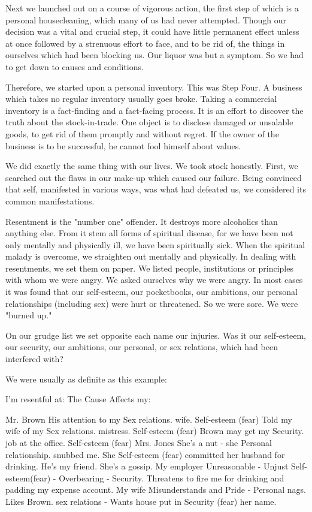 \begin{biblechapter}
Next we launched out on a course of vigorous action, the first step of which is a personal housecleaning, which many of us had never attempted.  Though our  decision was a vital and crucial step, it could have little permanent effect unless at once followed by a strenuous effort to face, and to be rid of, the things in ourselves which had been blocking us.  Our liquor was but a symptom.  So we had to get down to causes and conditions.

Therefore, we started upon a personal inventory.  This was Step Four.  A business which takes no regular inventory usually goes broke.  Taking a commercial  inventory is a fact-finding and a fact-facing process.  It is an effort to discover the truth about the stock-in-trade.  One object is to disclose damaged or unsalable goods, to get rid of them promptly and without regret.  If the owner of the business is to be successful, he cannot fool himself about values.

We did exactly the same thing with our lives.  We took stock honestly.  First, we searched out the flaws in our make-up which caused our failure.  Being convinced that self, manifested in various ways, was what had defeated us, we considered its common manifestations.

Resentment is the "number one" offender.  It destroys more alcoholics than anything else.  From it stem all forms of spiritual disease, for we have been not only mentally and physically ill, we have been spiritually sick.  When the spiritual malady is overcome, we straighten out mentally and physically.  In dealing with resentments, we set them on paper.  We listed people, institutions or principles with whom we were angry.  We asked ourselves why we were angry.  In most cases it was found that our self-esteem, our pocketbooks, our ambitions, our personal relationships (including sex) were hurt or threatened.  So we were sore.  We were "burned up."

On our grudge list we set opposite each name our  injuries.  Was it our self-esteem, our security, our ambitions, our personal, or sex relations, which had been  interfered with?

We were usually as definite as this example:

I'm resentful at:            The Cause                                    Affects my:

Mr. Brown 	His attention to my 	Sex relations.
 		wife. 	Self-esteem (fear) 
 	Told my wife of my 	Sex relations.
 		mistress. 	Self-esteem (fear)
 	Brown may get my  	Security.
 		job at the office. 	Self-esteem (fear)
Mrs. Jones 	She's a nut - she 	Personal relationship.
 		snubbed me. She 	Self-esteem (fear)
 		committed her husband 	
 		for drinking.
 		He's my friend.
 		She's a gossip.
My employer 	Unreasonable - Unjust 	Self-esteem(fear)
 		- Overbearing - 	Security.
 		Threatens to fire
 		me for drinking
 		and padding my expense
 		account.
My wife 	Misunderstands and 	Pride - Personal
 		nags. Likes Brown. 	sex  relations -
 		Wants house put in 	Security (fear)
 		her name.


\end{biblechapter}
